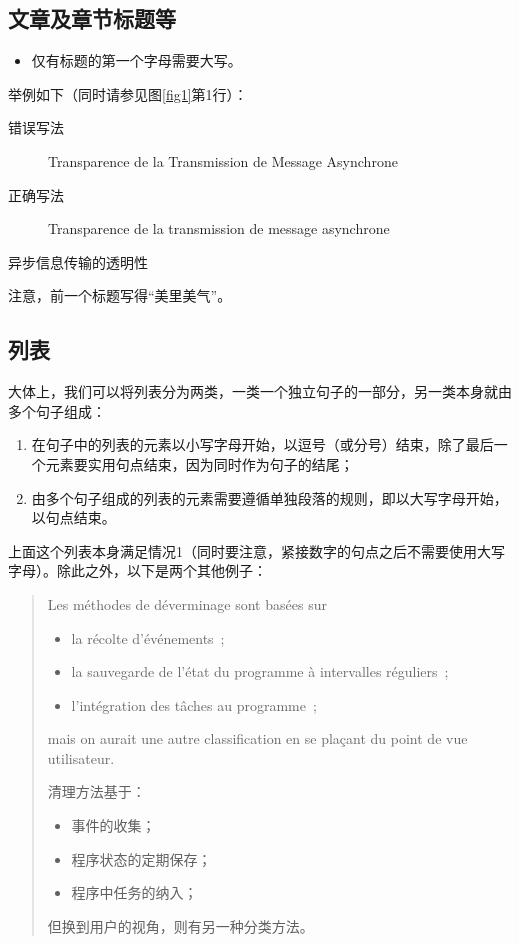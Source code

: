 \subsection{文章及章节标题等}

\begin{itemize}
    \item 仅有标题的第一个字母需要大写。
\end{itemize}

举例如下（同时请参见图\ref{fig1}第1行）：

\begin{description}
    \item[错误写法] Transparence de la Transmission de Message Asynchrone
    \item[正确写法] Transparence de la transmission de message asynchrone
\end{description}

\begin{bil}
    异步信息传输的透明性
\end{bil}

注意，前一个标题写得``美里美气''。

\subsection{列表}

大体上，我们可以将列表分为两类，一类一个独立句子的一部分，另一类本身就由多个句子组成：

\begin{enumerate}
    \item 在句子中的列表的元素以小写字母开始，以逗号（或分号）结束，除了最后一个元素要实用句点结束，因为同时作为句子的结尾；
    \item 由多个句子组成的列表的元素需要遵循单独段落的规则，即以大写字母开始，以句点结束。
\end{enumerate}

上面这个列表本身满足情况1（同时要注意，紧接数字的句点之后不需要使用大写字母）。除此之外，以下是两个其他例子：

\begin{quote}
    Les méthodes de déverminage sont basées sur
    \begin{itemize}
        \item la récolte d'événements~;
        \item la sauvegarde de l'état du programme à intervalles réguliers~;
        \item l'intégration des tâches au programme~;
    \end{itemize}
    mais on aurait une autre classification en se plaçant du point de vue utilisateur.
    \begin{bil}
        清理方法基于：
        \begin{itemize}
            \item 事件的收集；
            \item 程序状态的定期保存；
            \item 程序中任务的纳入；
        \end{itemize}
        但换到用户的视角，则有另一种分类方法。
    \end{bil}
    
\end{quote}

